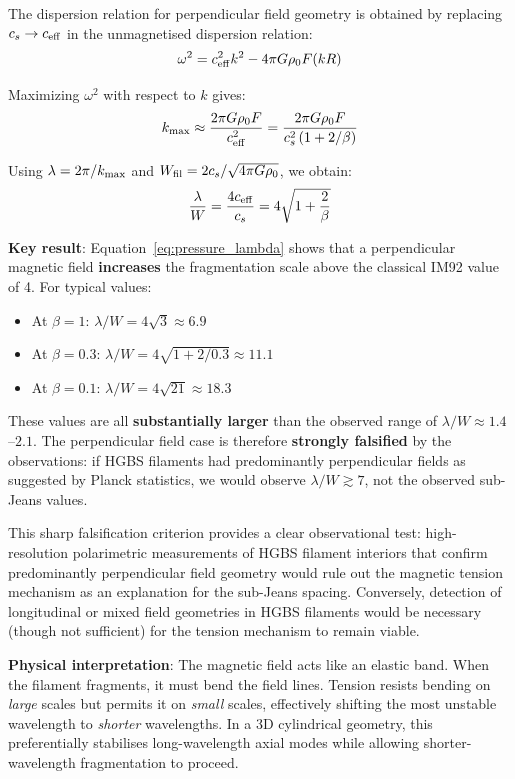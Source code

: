 \documentclass[11pt,a4paper]{article}
\begin{document}
The dispersion relation for perpendicular field geometry is obtained by replacing $c_s \rightarrow c_{\rm eff}$ in the unmagnetised dispersion relation:
\begin{equation}
\omega^2 = c_{\rm eff}^2 k^2 - 4\pi G \rho_0 F(kR)
\end{equation}

Maximizing $\omega^2$ with respect to $k$ gives:
\begin{equation}
k_{\rm max} \approx \frac{2\pi G \rho_0 F}{c_{\rm eff}^2} = \frac{2\pi G \rho_0 F}{c_s^2\left(1 + 2/\beta\right)}
\end{equation}

Using $\lambda = 2\pi/k_{\rm max}$ and $W_{\rm fil} = 2c_s/\sqrt{4\pi G\rho_0}$, we obtain:
\begin{equation}
\frac{\lambda}{W} = \frac{4c_{\rm eff}}{c_s} = 4\sqrt{1 + \frac{2}{\beta}}
\label{eq:pressure_lambda}
\end{equation}

\textbf{Key result}: Equation~\ref{eq:pressure_lambda} shows that a perpendicular magnetic field \textbf{increases} the fragmentation scale above the classical IM92 value of 4. For typical values:
\begin{itemize}
    \item At $\beta = 1$: $\lambda/W = 4\sqrt{3} \approx 6.9$
    \item At $\beta = 0.3$: $\lambda/W = 4\sqrt{1 + 2/0.3} \approx 11.1$
    \item At $\beta = 0.1$: $\lambda/W = 4\sqrt{21} \approx 18.3$
\end{itemize}

These values are all \textbf{substantially larger} than the observed range of $\lambda/W \approx 1.4$--$2.1$. The perpendicular field case is therefore \textbf{strongly falsified} by the observations: if HGBS filaments had predominantly perpendicular fields as suggested by Planck statistics, we would observe $\lambda/W \gtrsim 7$, not the observed sub-Jeans values.

This sharp falsification criterion provides a clear observational test: high-resolution polarimetric measurements of HGBS filament interiors that confirm predominantly perpendicular field geometry would rule out the magnetic tension mechanism as an explanation for the sub-Jeans spacing. Conversely, detection of longitudinal or mixed field geometries in HGBS filaments would be necessary (though not sufficient) for the tension mechanism to remain viable.

\textbf{Physical interpretation}: The magnetic field acts like an elastic band. When the filament fragments, it must bend the field lines. Tension resists bending on \textit{large} scales but permits it on \textit{small} scales, effectively shifting the most unstable wavelength to \textit{shorter} wavelengths. In a 3D cylindrical geometry, this preferentially stabilises long-wavelength axial modes while allowing shorter-wavelength fragmentation to proceed.
\end{document}
